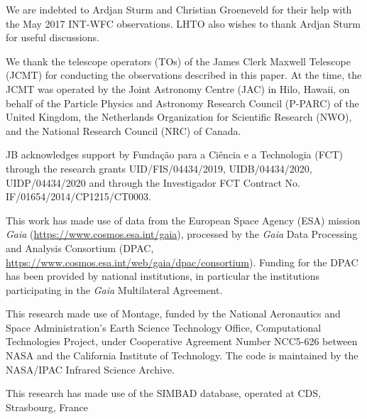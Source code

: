 \documentclass{aa}
\begin{document}
\begin{acknowledgements}
  We are indebted to Ardjan Sturm and Christian Groeneveld for their
  help with the May 2017 INT-WFC observations. LHTO also wishes to
  thank Ardjan Sturm for useful discussions.

\par We thank the telescope operators (TOs) of the James Clerk Maxwell
Telescope (JCMT) for conducting the observations described in this
paper. At the time, the JCMT was operated by the Joint Astronomy
Centre (JAC) in Hilo, Hawaii, on behalf of the Particle Physics and
Astronomy Research Council (P-PARC) of the United Kingdom, the Netherlands
Organization for Scientific Research (NWO), and the National Research
Council (NRC) of Canada.

\par JB acknowledges support by Funda\c{c}\~ao para a Ci\^encia e a
Technologia (FCT) through the research grants UID/FIS/04434/2019,
UIDB/04434/2020, UIDP/04434/2020 and through the Investigador FCT
Contract No. IF/01654/2014/CP1215/CT0003.

\par This work has made use of data from the European Space Agency (ESA)
mission {\it Gaia} (\url{https://www.cosmos.esa.int/gaia}), processed
by the {\it Gaia} Data Processing and Analysis Consortium (DPAC,
\url{https://www.cosmos.esa.int/web/gaia/dpac/consortium}). Funding
for the DPAC has been provided by national institutions, in particular
the institutions participating in the {\it Gaia} Multilateral
Agreement.

\par This research made use of Montage, funded by the National
Aeronautics and Space Administration's Earth Science Technology
Office, Computational Technologies Project, under Cooperative
Agreement Number NCC5-626 between NASA and the California Institute of
Technology. The code is maintained by the NASA/IPAC Infrared Science
Archive.

\par This research has made use of the SIMBAD database,
operated at CDS, Strasbourg, France 

\end{acknowledgements}




\appendix
\end{document}
